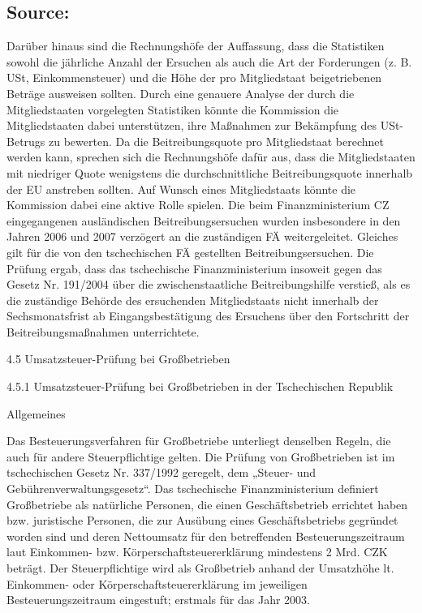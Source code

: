 \documentclass[10pt]{article}
\begin{document}
\subsection*{Source:}

Darüber hinaus sind die Rechnungshöfe der Auffassung, dass die Statistiken sowohl die jährliche Anzahl der Ersuchen als auch die Art der Forderungen (z. B. USt, Einkommensteuer) und die Höhe der pro Mitgliedstaat beigetriebenen Beträge ausweisen sollten.
Durch eine genauere Analyse der durch die Mitgliedstaaten vorgelegten Statistiken könnte die Kommission die Mitgliedstaaten dabei unterstützen, ihre Maßnahmen zur Bekämpfung des USt-Betrugs zu bewerten.
Da die Beitreibungsquote pro Mitgliedstaat berechnet werden kann, sprechen sich die Rechnungshöfe dafür aus, dass die Mitgliedstaaten mit niedriger Quote wenigstens die durchschnittliche Beitreibungsquote innerhalb der EU anstreben sollten.
Auf Wunsch eines Mitgliedstaats könnte die Kommission dabei eine aktive Rolle spielen.
Die beim Finanzministerium CZ eingegangenen ausländischen Beitreibungsersuchen wurden insbesondere in den Jahren 2006 und 2007 verzögert an die zuständigen FÄ weitergeleitet.
Gleiches gilt für die von den tschechischen FÄ gestellten Beitreibungsersuchen.
Die Prüfung ergab, dass das tschechische Finanzministerium insoweit gegen das Gesetz Nr. 191/2004 über die zwischenstaatliche Beitreibungshilfe verstieß, als es die zuständige Behörde des ersuchenden Mitgliedstaats nicht innerhalb der Sechsmonatsfrist ab Eingangsbestätigung des Ersuchens über den Fortschritt der Beitreibungsmaßnahmen unterrichtete.


4.5 Umsatzsteuer-Prüfung bei Großbetrieben



4.5.1 Umsatzsteuer-Prüfung bei Großbetrieben in der Tschechischen Republik



Allgemeines

Das Besteuerungsverfahren für Großbetriebe unterliegt denselben Regeln, die auch für andere Steuerpflichtige gelten.
Die Prüfung von Großbetrieben ist im tschechischen Gesetz Nr. 337/1992 geregelt, dem „Steuer- und Gebührenverwaltungsgesetz“.
Das tschechische Finanzministerium definiert Großbetriebe als natürliche Personen, die einen Geschäftsbetrieb errichtet haben bzw. juristische Personen, die zur Ausübung eines Geschäftsbetriebs gegründet worden sind und deren Nettoumsatz für den betreffenden Besteuerungszeitraum laut Einkommen- bzw. Körperschaftsteuererklärung mindestens 2 Mrd. CZK beträgt.
Der Steuerpflichtige wird als Großbetrieb anhand der Umsatzhöhe lt. Einkommen- oder Körperschaftsteuererklärung im jeweiligen Besteuerungszeitraum eingestuft; erstmals für das Jahr 2003.
\end{document}
